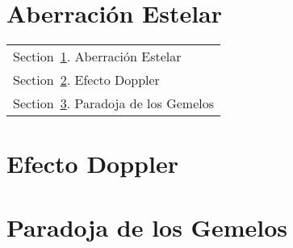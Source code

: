 \documentclass[../main]{subfiles}
\begin{document}
\section{Aberración Estelar}\label{Sec:Aberración}
        \begin{margintable}\vspace{1.4in}\footnotesize
		\begin{tabularx}{\marginparwidth}{|X}
        Section~\ref{Sec:Aberración}. Aberración Estelar\\
		Section~\ref{Sec:Doppler}. Efecto Doppler\\
        Section~\ref{Sec:Gemelos}. Paradoja de los Gemelos\\
		\end{tabularx}
        \end{margintable}
        
        \lipsum[1]
    \begin{adjustwidth}{0pt}{-100pt}
    
        \section{Efecto Doppler}\label{Sec:Doppler}
            \lipsum[1]

        \section{Paradoja de los Gemelos}\label{Sec:Gemelos}
            \lipsum[1]
    \end{adjustwidth}
\end{document}
